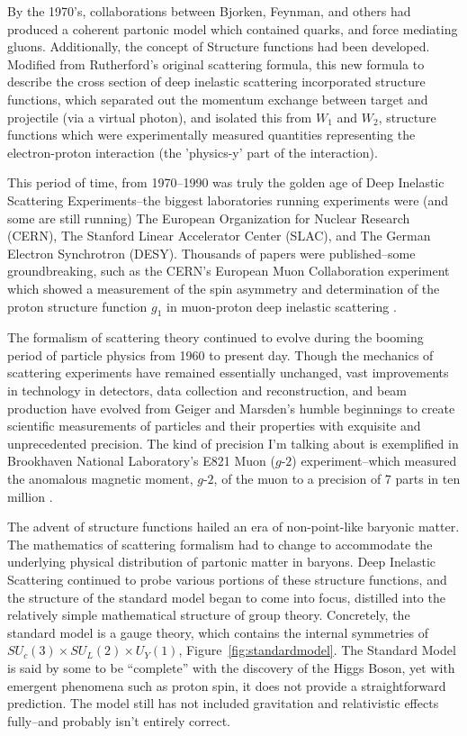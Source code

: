 By the 1970's, collaborations between Bjorken, Feynman, and others had produced a
coherent partonic model which contained quarks, and force mediating gluons.
Additionally, the concept of Structure functions had been developed. Modified
from Rutherford's original scattering formula, this new formula to describe the
cross section of deep inelastic scattering incorporated structure functions,
which separated out the momentum exchange between target and projectile (via a
virtual photon), and isolated this from $W_1$ and $W_2$, structure functions
which were experimentally measured quantities representing the electron-proton
interaction (the 'physics-y' part of the interaction).

This period of time, from 1970--1990 was truly the golden age of Deep Inelastic
Scattering Experiments--the biggest laboratories running experiments were (and
some are still running) The European Organization for Nuclear Research (CERN),
The Stanford Linear Accelerator Center (SLAC), and The German Electron
Synchrotron (DESY). Thousands of papers were published--some groundbreaking,
such as the CERN's European Muon Collaboration experiment which showed a
measurement of the spin asymmetry and determination of the proton structure
function $g_1$ in muon-proton deep inelastic scattering  \cite{Ashman1988}. 

The formalism of scattering theory continued to evolve during the booming period
of particle physics from 1960 to present day. Though the mechanics of scattering
experiments have remained essentially unchanged, vast improvements in technology
in detectors, data collection and reconstruction, and beam production have
evolved from Geiger and Marsden's humble beginnings to create scientific
measurements of particles and their properties with exquisite and unprecedented
precision. The kind of precision I'm talking about is exemplified in Brookhaven
National Laboratory's E821 Muon ($g$-$2$) experiment--which measured the
anomalous magnetic moment, $g$-$2$, of the muon to a precision of 7 parts in ten
million  \cite{Bennett}.

The advent of structure functions hailed an era of non-point-like baryonic
matter. The mathematics of scattering formalism had to change to accommodate the
underlying physical distribution of partonic matter in baryons. Deep Inelastic
Scattering continued to probe various portions of these structure functions, and
the structure of the standard model began to come into focus, distilled into the
relatively simple mathematical structure of group theory. Concretely, the
standard model is a gauge theory, which contains the internal symmetries of
$SU_{c}(3) \times SU_{L}(2) \times U_{Y}(1)$, Figure~\ref{fig:standardmodel}.
The Standard Model is said by some to be ``complete'' with the discovery of the
Higgs Boson, yet with emergent phenomena such as proton spin, it does not
provide a straightforward prediction. The model still has not included
gravitation and relativistic effects fully--and probably isn't entirely
correct.

